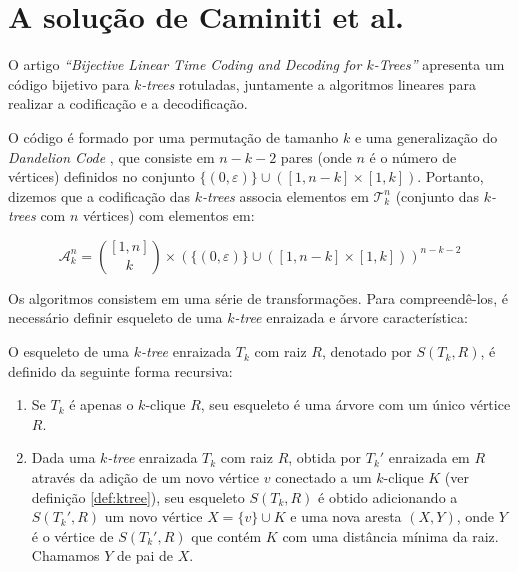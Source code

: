 \section{A solução de Caminiti et al.}

O artigo \emph{``Bijective Linear Time Coding and Decoding for $k$-Trees''} \cite{caminiti} apresenta um código bijetivo para \emph{$k$-trees} rotuladas, juntamente a algoritmos lineares para realizar a codificação e a decodificação.

O código é formado por uma permutação de tamanho $k$ e uma generalização do \emph{Dandelion Code} \cite{egecioglu}, que consiste em $n-k-2$ pares (onde $n$ é o número de vértices) definidos no conjunto $\{ ( 0, \varepsilon ) \} \cup ([1,n-k] \times [1,k])$. Portanto, dizemos que a codificação das \emph{$k$-trees} associa elementos em $\mathcal{T}^n_k$ (conjunto das \emph{$k$-trees} com $n$ vértices) com elementos em:

$$
\mathcal{A}^n_k = { [1,n] \choose k } \times (\{ ( 0, \varepsilon ) \} \cup ([1,n-k] \times [1,k]))^{n-k-2}
$$

Os algoritmos consistem em uma série de transformações. Para compreendê-los, é necessário definir esqueleto de uma \emph{$k$-tree} enraizada e árvore característica:

\begin{definition}
  \label{def:skeleton}
  \cite{caminiti} O esqueleto de uma \emph{$k$-tree} enraizada $T_k$ com raiz $R$, denotado por $S(T_k, R)$, é definido da seguinte forma recursiva:

  \begin{enumerate}
    \item Se $T_k$ é apenas o $k$-clique $R$, seu esqueleto é uma árvore com um único vértice $R$.
    \item Dada uma \emph{$k$-tree} enraizada $T_k$ com raiz $R$, obtida por $T_k'$ enraizada em $R$ através da adição de um novo vértice $v$ conectado a um $k$-clique $K$ (ver definição \ref{def:ktree}), seu esqueleto $S(T_k, R)$ é obtido adicionando a $S(T_k', R)$ um novo vértice $X = \{v\} \cup K$ e uma nova aresta $(X, Y)$, onde $Y$ é o vértice de $S(T_k', R)$ que contém $K$ com uma distância mínima da raiz. Chamamos $Y$ de pai de $X$.
  \end{enumerate}
\end{definition}

